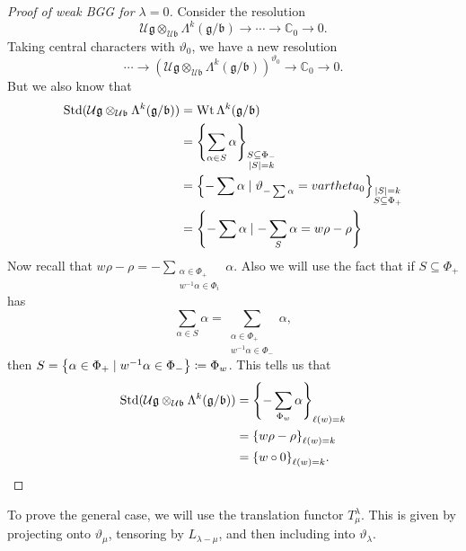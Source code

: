 \documentclass[leqno, openany]{memoir}
\theoremstyle{definition}
\theoremstyle{remark}
\theoremstyle{plain}
\theoremstyle{definition}
\theoremstyle{remark}
\newcommand{\C}{\mathbb{C}}
\newcommand{\U}{\mathcal{U}}
\newcommand{\g}{\mathfrak{g}}
\newcommand{\mf}[1]{\mathfrak{#1}}
\newcommand{\on}[1]{\operatorname{#1}}
\begin{document}
\begin{proof}[Proof of weak BGG for $\lambda = 0$]
    Consider the resolution
    \[ \U \g \otimes_{\U \mf{b}} \Lambda^k (\g / \mf{b}) \to \cdots \to \C_0 \to 0. \]
    Taking central characters with $\vartheta_0$, we have a new resolution
    \[ \cdots \to (\U \g \otimes_{\U \mf{b}} \Lambda^k (\g / \mf{b}))^{\vartheta_0} \to \C_0 \to 0. \]
    But we also know that
    \begin{align*}
        \on{Std}(\U \g \otimes_{\U \mf{b}} \Lambda^k (\g/\mf{b})) &= \on{Wt} \Lambda^k (\g / \mf{b}) \\
        &= \qty{\sum_{\alpha \in S} \alpha}_{\substack{S \subseteq \Phi_- \\ \abs{S} = k}} \\
        &= \qty{- \sum \alpha \mid \vartheta_{- \sum \alpha} = vartheta_0 }_{\substack{\abs{S} = k \\ S \subseteq \Phi_+}} \\
        &= \qty{- \sum \alpha \mid - \sum_S \alpha = w \rho - \rho} \\
    \end{align*}
    Now recall that $w \rho - \rho = - \sum_{\substack{\alpha \in \Phi_+ \\ w^{-1} \alpha \in \Phi_i}} \alpha$. Also we will use the fact that if $S \subseteq \Phi_+$ has 
    \[ \sum_{\alpha \in S} \alpha = \sum_{\substack{\alpha \in \Phi_+ \\ w^{-1} \alpha \in \Phi_-}} \alpha, \]
    then $S = \qty{\alpha \in \Phi_+ \mid w^{-1} \alpha \in \Phi_-} \coloneqq \Phi_w$. This tells us that
    \begin{align*}
        \on{Std}(\U \g \otimes_{\U \mf{b}} \Lambda^k (\g/\mf{b})) &= \qty{- \sum_{\Phi_w} \alpha}_{\ell(w) = k} \\
        &= \qty{w \rho - \rho}_{\ell(w) = k} \\
        &= \qty{w \circ 0}_{\ell(w) = k}. \qedhere
    \end{align*}
\end{proof}

To prove the general case, we will use the translation functor $T_{\mu}^{\lambda}$. This is given by projecting onto $\vartheta_{\mu}$, tensoring by $L_{\lambda - \mu}$, and then including into $\vartheta_{\lambda}$.
\end{document}
